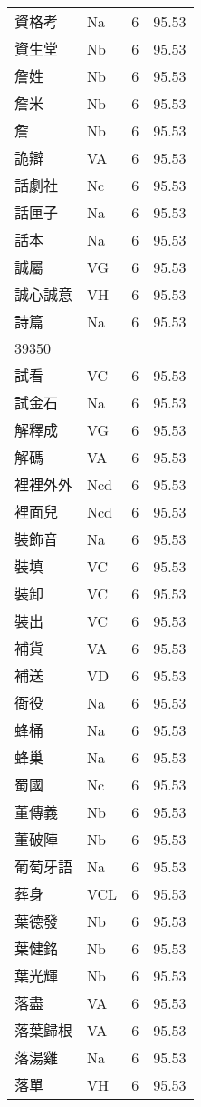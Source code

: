 \documentclass[twocolumn]{book}
\begin{document}
\begin{supertabular}{llrr}
資格考 & Na & 6 &  95.53\\
資生堂 & Nb & 6 &  95.53\\
詹姓 & Nb & 6 &  95.53\\
詹米 & Nb & 6 &  95.53\\
詹 & Nb & 6 &  95.53\\
詭辯 & VA & 6 &  95.53\\
話劇社 & Nc & 6 &  95.53\\
話匣子 & Na & 6 &  95.53\\
話本 & Na & 6 &  95.53\\
誠屬 & VG & 6 &  95.53\\
誠心誠意 & VH & 6 &  95.53\\
詩篇 & Na & 6 &  95.53\\
39350\\
試看 & VC & 6 &  95.53\\
試金石 & Na & 6 &  95.53\\
解釋成 & VG & 6 &  95.53\\
解碼 & VA & 6 &  95.53\\
裡裡外外 & Ncd & 6 &  95.53\\
裡面兒 & Ncd & 6 &  95.53\\
裝飾音 & Na & 6 &  95.53\\
裝填 & VC & 6 &  95.53\\
裝卸 & VC & 6 &  95.53\\
裝出 & VC & 6 &  95.53\\
補貨 & VA & 6 &  95.53\\
補送 & VD & 6 &  95.53\\
衙役 & Na & 6 &  95.53\\
蜂桶 & Na & 6 &  95.53\\
蜂巢 & Na & 6 &  95.53\\
蜀國 & Nc & 6 &  95.53\\
董傳義 & Nb & 6 &  95.53\\
董破陣 & Nb & 6 &  95.53\\
葡萄牙語 & Na & 6 &  95.53\\
葬身 & VCL & 6 &  95.53\\
葉德發 & Nb & 6 &  95.53\\
葉健銘 & Nb & 6 &  95.53\\
葉光輝 & Nb & 6 &  95.53\\
落盡 & VA & 6 &  95.53\\
落葉歸根 & VA & 6 &  95.53\\
落湯雞 & Na & 6 &  95.53\\
落單 & VH & 6 &  95.53\\

\end{supertabular}
\end{document}
